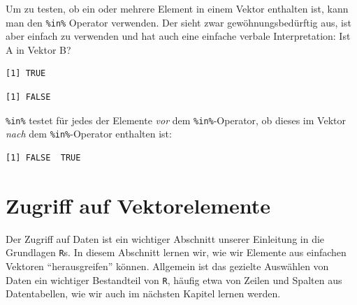 \documentclass[12pt,]{tufte-book}
\newenvironment{Shaded}{\begin{snugshade}}{\end{snugshade}}
\newcommand{\KeywordTok}[1]{\textcolor[rgb]{0.13,0.29,0.53}{\textbf{#1}}}
\newcommand{\DecValTok}[1]{\textcolor[rgb]{0.00,0.00,0.81}{#1}}
\newcommand{\StringTok}[1]{\textcolor[rgb]{0.31,0.60,0.02}{#1}}
\newcommand{\OperatorTok}[1]{\textcolor[rgb]{0.81,0.36,0.00}{\textbf{#1}}}
\newcommand{\NormalTok}[1]{#1}
\theoremstyle{definition}
\theoremstyle{definition}
\theoremstyle{definition}
\theoremstyle{remark}
\begin{document}
Um zu testen, ob ein oder mehrere Element in einem Vektor enthalten ist,
kann man den \texttt{\%in\%} Operator verwenden. Der sieht zwar
gewöhnungsbedürftig aus, ist aber einfach zu verwenden und hat auch eine
einfache verbale Interpretation: Ist A in Vektor B?

\begin{Shaded}
\end{Shaded}

\begin{verbatim}
[1] TRUE
\end{verbatim}

\begin{Shaded}
\end{Shaded}

\begin{verbatim}
[1] FALSE
\end{verbatim}

\texttt{\%in\%} testet für jedes der Elemente \emph{vor} dem
\texttt{\%in\%}-Operator, ob dieses im Vektor \emph{nach} dem
\texttt{\%in\%}-Operator enthalten ist:

\begin{Shaded}
\end{Shaded}

\begin{verbatim}
[1] FALSE  TRUE
\end{verbatim}

\section{Zugriff auf Vektorelemente}\label{zugriff-auf-vektorelemente}

Der Zugriff auf Daten ist ein wichtiger Abschnitt unserer Einleitung in
die Grundlagen \texttt{R}s. In diesem Abschnitt lernen wir, wie wir
Elemente aus einfachen Vektoren ``herausgreifen'' können. Allgemein ist
das gezielte Auswählen von Daten ein wichtiger Bestandteil von
\texttt{R}, häufig etwa von Zeilen und Spalten aus Datentabellen, wie
wir auch im nächsten Kapitel lernen werden.
\end{document}
